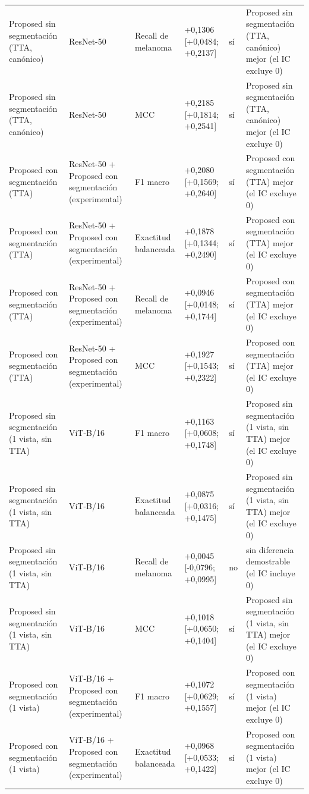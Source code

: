 \begin{longtable}{@{}llllll@{}}
Proposed sin segmentación (TTA, canónico) & ResNet-50 & Recall de melanoma & +0,1306 [+0,0484; +0,2137] & sí & Proposed sin segmentación (TTA, canónico) mejor (el IC excluye 0) \\
Proposed sin segmentación (TTA, canónico) & ResNet-50 & MCC & +0,2185 [+0,1814; +0,2541] & sí & Proposed sin segmentación (TTA, canónico) mejor (el IC excluye 0) \\
Proposed con segmentación (TTA) & ResNet-50 + Proposed con segmentación (experimental) & F1 macro & +0,2080 [+0,1569; +0,2640] & sí & Proposed con segmentación (TTA) mejor (el IC excluye 0) \\
Proposed con segmentación (TTA) & ResNet-50 + Proposed con segmentación (experimental) & Exactitud balanceada & +0,1878 [+0,1344; +0,2490] & sí & Proposed con segmentación (TTA) mejor (el IC excluye 0) \\
Proposed con segmentación (TTA) & ResNet-50 + Proposed con segmentación (experimental) & Recall de melanoma & +0,0946 [+0,0148; +0,1744] & sí & Proposed con segmentación (TTA) mejor (el IC excluye 0) \\
Proposed con segmentación (TTA) & ResNet-50 + Proposed con segmentación (experimental) & MCC & +0,1927 [+0,1543; +0,2322] & sí & Proposed con segmentación (TTA) mejor (el IC excluye 0) \\
Proposed sin segmentación (1 vista, sin TTA) & ViT-B/16 & F1 macro & +0,1163 [+0,0608; +0,1748] & sí & Proposed sin segmentación (1 vista, sin TTA) mejor (el IC excluye 0) \\
Proposed sin segmentación (1 vista, sin TTA) & ViT-B/16 & Exactitud balanceada & +0,0875 [+0,0316; +0,1475] & sí & Proposed sin segmentación (1 vista, sin TTA) mejor (el IC excluye 0) \\
Proposed sin segmentación (1 vista, sin TTA) & ViT-B/16 & Recall de melanoma & +0,0045 [-0,0796; +0,0995] & no & sin diferencia demostrable (el IC incluye 0) \\
Proposed sin segmentación (1 vista, sin TTA) & ViT-B/16 & MCC & +0,1018 [+0,0650; +0,1404] & sí & Proposed sin segmentación (1 vista, sin TTA) mejor (el IC excluye 0) \\
Proposed con segmentación (1 vista) & ViT-B/16 + Proposed con segmentación (experimental) & F1 macro & +0,1072 [+0,0629; +0,1557] & sí & Proposed con segmentación (1 vista) mejor (el IC excluye 0) \\
Proposed con segmentación (1 vista) & ViT-B/16 + Proposed con segmentación (experimental) & Exactitud balanceada & +0,0968 [+0,0533; +0,1422] & sí & Proposed con segmentación (1 vista) mejor (el IC excluye 0) \\

\end{longtable}

